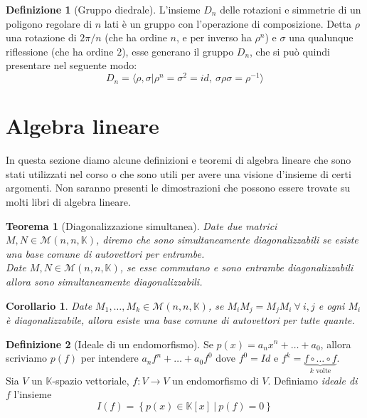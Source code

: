 \documentclass[11pt]{article}
\theoremstyle{plain}
\newtheorem{thm}{Teorema}[section]
\newtheorem*{cor}{Corollario}
\theoremstyle{definition}
\newtheorem{defn}{Definizione}[section]
\theoremstyle{remark}
\newcommand{\K}{\mathbb{K}}
\begin{document}
\begin{defn}[Gruppo diedrale]
L'insieme $D_n$ delle rotazioni e simmetrie di un poligono regolare di $n$ lati è un gruppo con l'operazione di composizione.
Detta $\rho$ una rotazione di $2\pi/n$ (che ha ordine $n$, e per inverso ha $\rho^{n}$) e $\sigma$ una qualunque riflessione (che ha ordine $2$), esse generano
il gruppo $D_n$, che si può quindi presentare nel seguente modo: $$D_n=\langle\rho,\sigma|\rho^n=\sigma^2=id,\ \sigma\rho\sigma=\rho^{-1}\rangle$$
\end{defn}









\newpage
\section{Algebra lineare}
In questa sezione diamo alcune definizioni e teoremi di algebra lineare che sono stati utilizzati nel corso o che sono utili per avere una visione d'insieme di certi argomenti. Non saranno presenti le dimostrazioni che possono essere trovate su molti libri di algebra lineare.
\begin{thm}[Diagonalizzazione simultanea]
\label{thm:diag_sim}
	Date due matrici $M, N\in \mathcal{M}(n,n,\K)$, diremo che sono \textit{simultaneamente diagonalizzabili} se esiste una base comune di autovettori per entrambe.\\
	Date $M, N\in \mathcal{M}(n,n,\K)$, se esse commutano e sono entrambe diagonalizzabili allora sono simultaneamente diagonalizzabili.
\end{thm}
\begin{cor}
	Date $M_1,\ldots,M_k \in \mathcal{M}(n,n,\K)$, se $M_iM_j=M_jM_i\ \forall\ i, j$ e ogni $M_i$ è diagonalizzabile, allora esiste una base comune di autovettori per tutte quante.
\end{cor}


\begin{defn}[Ideale di un endomorfismo]
	Se $p(x)=a_n x^n+\ldots+a_0$, allora scriviamo $p(f)$ per intendere $a_nf^n+\ldots+a_0f^0$ dove $f^0=Id$ e $f^k=\underbrace{f\circ\ldots\circ f}_{k \text{ volte}}$.\\
	Sia $V$ un $\K$-spazio vettoriale, $f:V\to V$ un endomorfismo di $V$. Definiamo \textit{ideale di $f$} l'insieme
	\[
		I(f)=\left\{ p(x)\in \K[x]\ |\ p(f)=0 \right\}
	\]
	

\end{defn}
\end{document}
